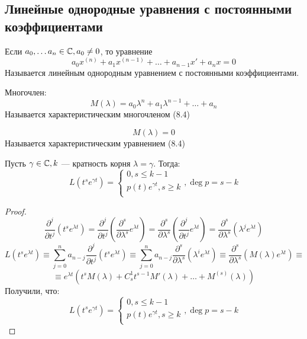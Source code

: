 \subsection{Линейные однородные уравнения с постоянными коэффициентами}

\begin{definition}
    Если \(a_0, \dots a_n \in \mathbb{C}, a_0 \ne 0\), то уравнение
    \begin{equation}
        a_0x^{(n)} + a_1x^{(n - 1)} + \dots + a_{n - 1}x' + a_nx = 0
    \end{equation}
    Называется линейным однородным уравнением с постоянными коэффициентами.
\end{definition}

\begin{definition}
    Многочлен:
    \[M(\lambda) = a_0\lambda^n + a_1\lambda^{n - 1} + \dots + a_n\]
    Называется характеристическим многочленом (8.4)
\end{definition}

\begin{definition}
    \begin{equation}
        M(\lambda) = 0
    \end{equation}
    Называется характеристическим уравнением (8.4)
\end{definition}

\begin{lemma}
    Пусть \(\gamma \in \mathbb{C}, k\) --- кратность корня \(\lambda = \gamma\). Тогда:
    \[L\left( t^se^{\gamma t} \right) = \left\{\begin{array}{l}
        0, s \le k - 1 \\
        p(t)e^{\gamma t}, s \ge k \\
    \end{array}\right., \deg p = s - k\]
\end{lemma}
\begin{proof}
    \[\frac{\partial^j}{\partial t^j}\left( t^s e^{\lambda t} \right) = \frac{\partial^j}{\partial t^j}\left( \frac{\partial^s}{\partial \lambda^s}e^{\lambda t} \right) = \frac{\partial^s}{\partial \lambda^s}\left( \frac{\partial^j}{\partial t^j}e^{\lambda t} \right) = \frac{\partial^s}{\partial \lambda^s}\left( \lambda^j e^{\lambda t} \right)\]
    \[L\left( t^s e^{\lambda t} \right) \equiv \sum_{j = 0}^n a_{n - j}\frac{\partial^j}{\partial t^j}\left( t^s e^{\lambda t} \right) \equiv \sum_{j = 0}^n a_{n - j}\frac{\partial^s}{\partial \lambda^s}\left( \lambda^i e^{\lambda t} \right) \equiv \frac{\partial^s}{\partial \lambda^s}\left( M(\lambda)e^{\lambda t} \right) \equiv \]
    \[\equiv e^{\lambda t}\left( t^sM(\lambda) + C_s^1t^{s - 1}M'(\lambda) + \dots + M^{(s)}(\lambda) \right)\]
    Получили, что:
    \[L\left( t^se^{\gamma t} \right) = \left\{\begin{array}{l}
        0, s \le k - 1 \\
        p(t)e^{\gamma t}, s \ge k \\
    \end{array}\right., \deg p = s - k\]
\end{proof}

